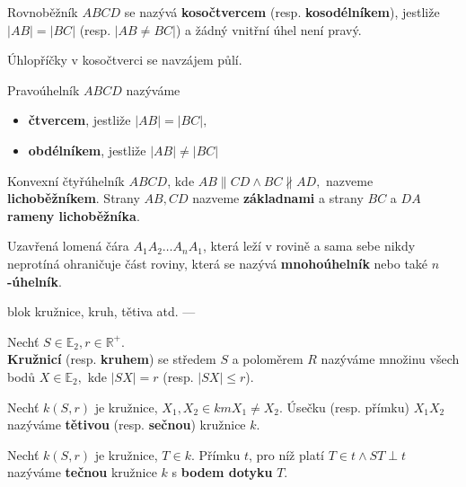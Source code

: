 \begin{definition}
  Rovnoběžník $ABCD$ se nazývá \textbf{kosočtvercem} (resp. \textbf{kosodélníkem}), jestliže $|AB|=|BC|$ (resp. $|AB\ne BC|$) a žádný vnitřní úhel není pravý.
\end{definition}


\begin{veta}
  Úhlopříčky v kosočtverci se navzájem půlí.
\end{veta}

\begin{definition}
  Pravoúhelník $ABCD$ nazýváme
  \begin{itemize}
    \item \textbf{čtvercem}, jestliže $|AB|=|BC|,$
    \item \textbf{obdélníkem}, jestliže $|AB| \ne |BC|$
  \end{itemize}
\end{definition}

\begin{definition}
  Konvexní čtyřúhelník $ABCD$, kde $AB \parallel CD \land BC \nparallel AD,$ nazveme \textbf{lichoběžníkem}. Strany $AB, CD$ nazveme \textbf{základnami} a strany $BC$ a $DA$ \textbf{rameny lichoběžníka}.
\end{definition}

\begin{definition}
  Uzavřená lomená čára $A_1A_2\dots A_nA_1$, která leží v rovině a sama sebe nikdy neprotíná ohraničuje část roviny, která se nazývá \textbf{mnohoúhelník} nebo také \textbf{$n$-úhelník}.
\end{definition}

blok kružnice, kruh, tětiva atd. ---
\begin{definition}
  Nechť $S \in \mathbb E_2, r \in \mathbb R^+.$\\
  \textbf{Kružnicí} (resp. \textbf{kruhem}) se středem $S$ a poloměrem $R$ nazýváme množinu všech bodů $X\in \mathbb E_2, $ kde $|SX|=r$ (resp. $|SX|\leq r$).
\end{definition}

\begin{definition}
  Nechť $k(S,r)$ je kružnice, $X_1, X_2 \in km X_1\ne X_2.$ Úsečku (resp. přímku) $X_1X_2$ nazýváme \textbf{tětivou} (resp. \textbf{sečnou}) kružnice $k$.
\end{definition}


\begin{definition}
  Nechť $k(S,r)$ je kružnice, $T\in k$. Přímku $t$, pro níž platí $T\in t \land ST \perp t$ nazýváme \textbf{tečnou} kružnice $k$ s \textbf{bodem dotyku} $T$.
\end{definition}

